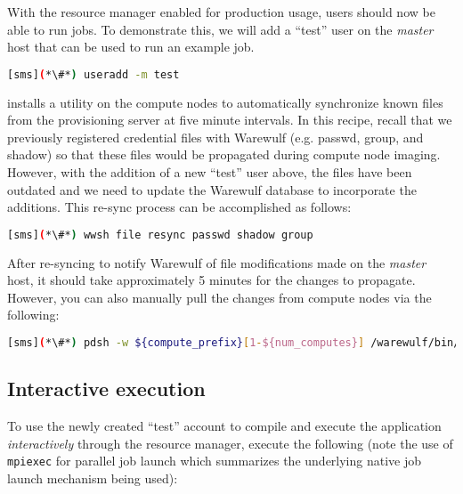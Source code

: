 With the resource manager enabled for production usage, users should now be
able to run jobs. To demonstrate this, we will add a ``test'' user on the {\em master}
host that can be used to run an example job.

\begin{lstlisting}[language=bash,keywords={}]
[sms](*\#*) useradd -m test
\end{lstlisting}

\Warewulf{} installs a utility on the compute nodes to automatically
synchronize known files from the provisioning server at five minute intervals. In this
recipe, recall that we previously registered credential files with Warewulf (e.g. passwd,
group, and shadow) so that these files would be propagated during compute node
imaging. However, with the addition of a new ``test'' user above, the files
have been outdated and we need to update the Warewulf database to incorporate
the additions. This re-sync process can be accomplished as follows:

\begin{lstlisting}[language=bash,keywords={}]
[sms](*\#*) wwsh file resync passwd shadow group
\end{lstlisting}


\begin{center}
\begin{tcolorbox}[]
\small
After re-syncing to notify Warewulf of file modifications made on the {\em
master} host, it should take approximately 5 minutes for the changes to
propagate. However, you can also manually pull the changes from compute nodes
via the following:
\begin{lstlisting}[language=bash,keywords={}]
[sms](*\#*) pdsh -w ${compute_prefix}[1-${num_computes}] /warewulf/bin/wwgetfiles
\end{lstlisting}
\end{tcolorbox}
\end{center}




\subsection{Interactive execution}
To use the newly created ``test'' account to compile and execute the
application {\em interactively} through the resource manager, execute the
following (note the use of \texttt{mpiexec} for parallel job launch which summarizes
the underlying native job launch mechanism being used):

